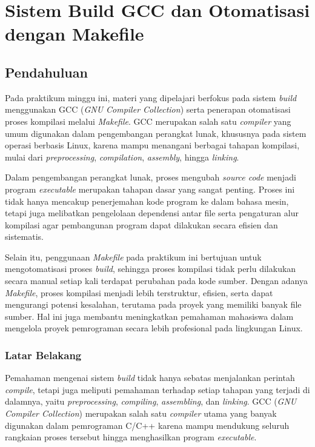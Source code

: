 
\chapter{Sistem Build GCC dan Otomatisasi dengan Makefile}
\label{chap:handson-x}

\section{Pendahuluan}
\label{sec:pendahuluan}
Pada praktikum minggu ini, materi yang dipelajari berfokus pada sistem \textit{build} menggunakan GCC (\textit{GNU Compiler Collection}) serta penerapan otomatisasi proses kompilasi melalui \textit{Makefile}. GCC merupakan salah satu \textit{compiler} yang umum digunakan dalam pengembangan perangkat lunak, khususnya pada sistem operasi berbasis Linux, karena mampu menangani berbagai tahapan kompilasi, mulai dari \textit{preprocessing}, \textit{compilation}, \textit{assembly}, hingga \textit{linking}.

Dalam pengembangan perangkat lunak, proses mengubah \textit{source code} menjadi program \textit{executable} merupakan tahapan dasar yang sangat penting. Proses ini tidak hanya mencakup penerjemahan kode program ke dalam bahasa mesin, tetapi juga melibatkan pengelolaan dependensi antar file serta pengaturan alur kompilasi agar pembangunan program dapat dilakukan secara efisien dan sistematis.

Selain itu, penggunaan \textit{Makefile} pada praktikum ini bertujuan untuk mengotomatisasi proses \textit{build}, sehingga proses kompilasi tidak perlu dilakukan secara manual setiap kali terdapat perubahan pada kode sumber. Dengan adanya \textit{Makefile}, proses kompilasi menjadi lebih terstruktur, efisien, serta dapat mengurangi potensi kesalahan, terutama pada proyek yang memiliki banyak file sumber. Hal ini juga membantu meningkatkan pemahaman mahasiswa dalam mengelola proyek pemrograman secara lebih profesional pada lingkungan Linux.

\subsection{Latar Belakang}
\label{subsec:latar-belakang}
Pemahaman mengenai sistem \textit{build} tidak hanya sebatas menjalankan perintah \textit{compile}, tetapi juga meliputi pemahaman terhadap setiap tahapan yang terjadi di dalamnya, yaitu \textit{preprocessing}, \textit{compiling}, \textit{assembling}, dan \textit{linking}. GCC (\textit{GNU Compiler Collection}) merupakan salah satu \textit{compiler} utama yang banyak digunakan dalam pemrograman C/C++ karena mampu mendukung seluruh rangkaian proses tersebut hingga menghasilkan program \textit{executable}.

